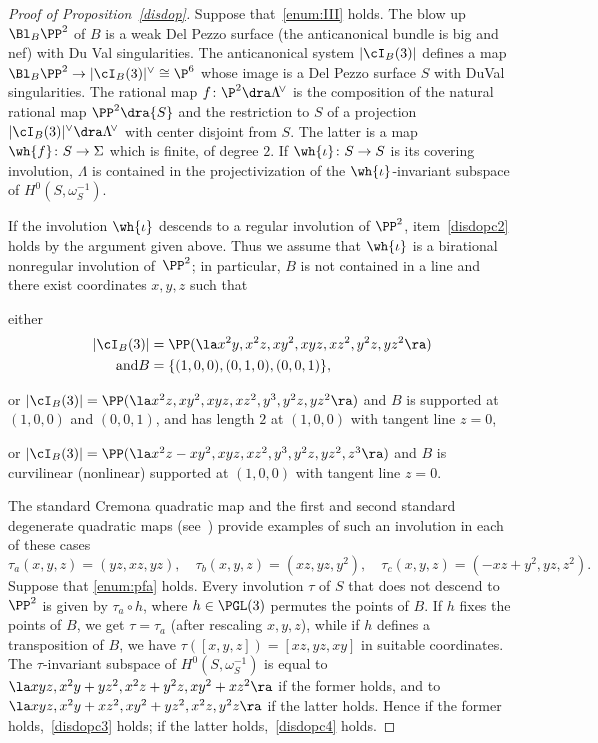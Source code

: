 \begin{proof}[Proof of Proposition~\ref{disdop}]
Suppose that~\eqref{enum:III} holds. The blow up $\Bl_{B}\PP^2$ of $B$ is a weak Del Pezzo surface (the anticanonical bundle is big and nef) with Du Val singularities. The anticanonical system
$|\cI_{B}(3)|$ defines a map $\Bl_{B}\PP^2\to |\cI_{B}(3)|^{\vee}\cong \P^6$ whose image is a Del Pezzo surface $ S$ with DuVal singularities. The rational map $f\colon\P^2\dra \Lambda^{\!\vee}$ is the composition of the natural rational map $\PP^2\dra { S}$ and the restriction to $ S$ of a projection $ |\cI_{B}(3)|^{\vee}\dra \Lambda^{\!\vee}$ with center disjoint from ${ S}$. The latter is
a map $\wh{f}\colon { S}\to \Sigma$ which is finite, of degree $2$. If $\wh{\iota}\colon { S}\to { S}$ is its covering involution, $\Lambda$ is contained in the projectivization of the $\wh{\iota}$-invariant subspace of $H^0({ S},\omega^{-1}_{{ S}})$.

If the involution $\wh{\iota}$ descends to a regular involution of $\PP^2$, item~\eqref{disdopc2} holds by the argument given above. Thus we assume that $\wh{\iota}$ is a birational nonregular involution of~$\PP^2$; in particular,
$B$ is not contained in a line and there exist coordinates $x,y,z$ such that
\begin{enumeratea}
\item\label{enum:pfa}
either\vspace*{-8pt}
\begin{align*}
|\cI_{B}(3)|&=\PP(\la x^2y, x^2z, xy^2,xyz, xz^2, y^2z, yz^2 \ra)\\\tag*{and} {B}&=\{(1,0,0),(0,1,0),(0,0,1)\},
\end{align*}
\item\label{enum:pfb}
or
$|\cI_{B}(3)|=\PP(\la x^2z, xy^2,xyz, xz^2, y^3, y^2z, yz^2 \ra)$ and $B$ is supported at $(1,0,0)$ and $(0,0,1)$, and has length $2$ at $(1,0,0)$ with tangent line $z=0$,
\item\label{enum:pfc}
or
$|\cI_{B}(3)|=\PP(\la x^2z-xy^2,xyz, xz^2, y^3, y^2z, yz^2,z^3 \ra)$ and $B$ is curvilinear (nonlinear) supported at $(1,0,0)$ with tangent line $z=0$.
\end{enumeratea}
The standard Cremona quadratic map and the first and second standard degenerate quadratic maps (see~\cite[Ex.\,7.1.9]{dolga}) provide examples of such an involution in each of these cases\vspace*{-3pt}\enlargethispage{1\baselineskip}%
\[
\tau_a(x,y,z)=(yz,xz,yz),\quad \tau_b(x,y,z)=(xz,yz,y^2),\quad \tau_c(x,y,z)=(-xz+y^2,yz,z^2).
\]
Suppose that \eqref{enum:pfa} holds. Every involution $\tau$ of ${ S}$ that does not descend to
$\PP^2$
is given by $\tau_a\circ h$, where $h\in\PGL(3)$ permutes the points of ${B}$. If $h$ fixes the points of $B$, we get $\tau=\tau_a$ (after rescaling $x,y,z$), while if $h$ defines a transposition of $B$, we have $\tau([x,y,z])=[xz,yz,xy]$ in suitable coordinates.
The $\tau$-invariant subspace of $H^0({ S},\omega^{-1}_{{ S}})$ is equal to $\la xyz,x^2y+yz^2,x^2z+y^2z,xy^2+xz^2\ra$ if the former holds, and to $\la xyz,x^2y+xz^2,xy^2+yz^2,x^2z,y^2z\ra$
if the latter holds.
Hence if the former holds,~\eqref{disdopc3} holds; if the latter holds,~\eqref{disdopc4} holds.


\end{proof}
